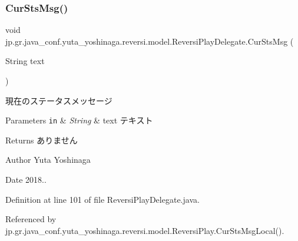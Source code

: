 \subsubsection{\texorpdfstring{Cur\+Sts\+Msg()}{CurStsMsg()}}
{\footnotesize\ttfamily void jp.\+gr.\+java\+\_\+conf.\+yuta\+\_\+yoshinaga.\+reversi.\+model.\+Reversi\+Play\+Delegate.\+Cur\+Sts\+Msg (\begin{DoxyParamCaption}\item[{String}]{text }\end{DoxyParamCaption})}



現在のステータスメッセージ 


\begin{DoxyParams}[1]{Parameters}
\mbox{\tt in}  & {\em String} & text テキスト \\
\hline
\end{DoxyParams}
\begin{DoxyReturn}{Returns}
ありません 
\end{DoxyReturn}
\begin{DoxyAuthor}{Author}
Yuta Yoshinaga 
\end{DoxyAuthor}
\begin{DoxyDate}{Date}
2018.. 
\end{DoxyDate}


Definition at line 101 of file Reversi\+Play\+Delegate.\+java.



Referenced by jp.\+gr.\+java\+\_\+conf.\+yuta\+\_\+yoshinaga.\+reversi.\+model.\+Reversi\+Play.\+Cur\+Sts\+Msg\+Local().


